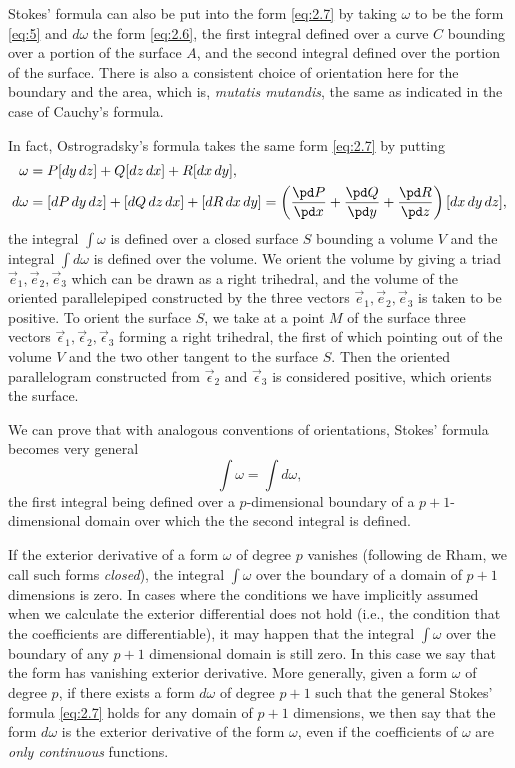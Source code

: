 Stokes' formula can also be put into the form \eqref{eq:2.7} by taking $\omega$ to be the form \eqref{eq:5} and $d\omega$ the form \eqref{eq:2.6}, the first integral defined over a curve $C$ bounding over a portion of the surface $A$, and the second integral defined over the portion of the surface. There is also a consistent choice of orientation here for the boundary and the area, which is, \emph{mutatis mutandis}, the same  as indicated in the case of Cauchy's formula.

In fact, Ostrogradsky's formula takes the same form \eqref{eq:2.7} by putting
\begin{align*}
  \omega&=P[dy\,dz]+Q[dz\,dx]+R[dx\,dy],\\
  d\omega&=[dP\,dy\,dz]+[dQ\,dz\,dx]+[dR\,dx\,dy]=\left(\frac{\pd P}{\pd x}+\frac{\pd Q}{\pd y}+\frac{\pd R}{\pd z}\right)[dx\,dy\,dz],
\end{align*}
the integral $\int \omega$ is defined over a closed surface $S$ bounding a volume $V$ and the integral $\int d\omega$ is defined over the volume. We orient the volume by giving a triad $\vec{e}_{1},\vec{e}_{2},\vec{e}_{3}$ which can be drawn as a right trihedral, and the volume of the oriented parallelepiped constructed by the three vectors $\vec{e}_{1},\vec{e}_{2},\vec{e}_{3}$ is taken to be positive. To orient the surface $S$, we take at a point $M$ of the surface three vectors $\vec{\epsilon}_{1},\vec{\epsilon}_{2},\vec{\epsilon}_{3}$ forming a right trihedral, the first of which pointing out of the volume $V$ and the two other tangent to the surface $S$. Then the oriented parallelogram constructed from $\vec{\epsilon}_{2}$ and $\vec{\epsilon}_{3}$ is considered positive, which orients the surface.

We can prove that with analogous conventions of orientations, Stokes' formula becomes very general
\[
\int \omega=\int d\omega,
\]
the first integral being defined over a $p$-dimensional boundary of a $p+1$-dimensional domain over which the the second integral is defined.

\vspace{12pt}\fsec If the exterior derivative of a form $\omega$ of degree $p$ vanishes (following de Rham, we call such forms \emph{closed}), the integral $\int\omega$ over the boundary of a domain of $p+1$ dimensions is zero. In cases where the conditions we have implicitly assumed when we calculate the exterior differential does not hold ({i.e.}, the condition that the coefficients are differentiable), it may happen that the integral $\int \omega$ over the boundary of any $p+1$ dimensional domain is still zero.  In this case we say that the form has vanishing exterior derivative. More generally, given a form $\omega$ of degree $p$, if there exists a form $d\omega$ of degree $p+1$ such that the general Stokes' formula \eqref{eq:2.7} holds for any domain of $p+1$ dimensions, we then say that the form $d\omega$ is the exterior derivative of the form $\omega$, even if the coefficients of $\omega$ are \emph{only continuous} functions.

